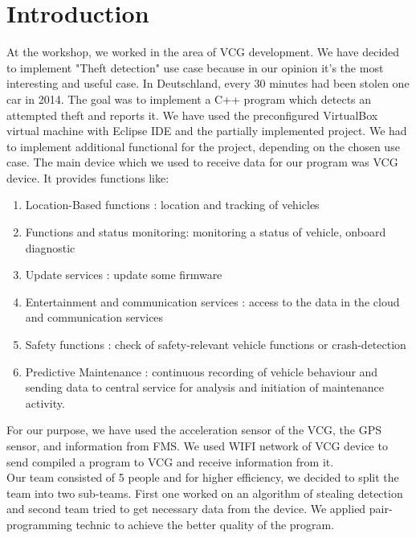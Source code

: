 \chapter{Introduction}
At the workshop, we worked in the area of VCG development. We have decided to implement "Theft detection" use case because in our opinion it's the most interesting and useful case. In Deutschland, every 30 minutes had been stolen one car in 2014. 
The goal was to implement a C++ program which detects an attempted theft and reports it. We have used the preconfigured VirtualBox virtual machine with Eclipse IDE and the partially implemented project. We had to implement additional functional for the project, depending on the chosen use case.  The main device which we used to receive data for our program was VCG device. It provides functions like: 
\begin{enumerate}
	\item Location-Based functions : location and tracking of vehicles 
	\item Functions and status monitoring:  monitoring a status of vehicle, onboard diagnostic
	\item Update services : update some firmware
	\item Entertainment and communication services : access to the data in the cloud and communication services
	\item Safety functions : check of safety-relevant vehicle functions or crash-detection
	\item Predictive Maintenance : continuous recording of vehicle behaviour and sending data to central service for analysis and initiation of maintenance activity.
\end{enumerate}
For our purpose, we have used the acceleration sensor of the VCG, the GPS sensor, and information from FMS. We used WIFI network of VCG device to send compiled a program to VCG and receive information from it.\\
Our team consisted of 5 people and for higher efficiency, we decided to split the team into two sub-teams. First one worked on an algorithm of stealing detection and second team tried to get necessary data from the device. We applied pair-programming technic to achieve the better quality of the program.\\